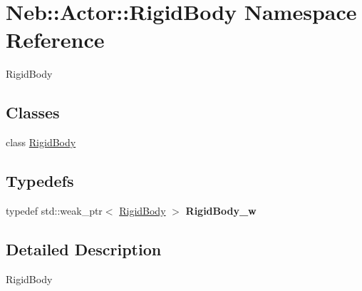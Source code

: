 \hypertarget{namespaceNeb_1_1Actor_1_1RigidBody}{\section{\-Neb\-:\-:\-Actor\-:\-:\-Rigid\-Body \-Namespace \-Reference}
\label{namespaceNeb_1_1Actor_1_1RigidBody}
}


\-Rigid\-Body  


\subsection*{\-Classes}
\begin{DoxyCompactItemize}
\item 
class \hyperlink{classNeb_1_1Actor_1_1RigidBody_1_1RigidBody}{\-Rigid\-Body}
\end{DoxyCompactItemize}
\subsection*{\-Typedefs}
\begin{DoxyCompactItemize}
\item 
\hypertarget{namespaceNeb_1_1Actor_1_1RigidBody_aebb4604ca789a06449e096e08b7cedd9}{typedef std\-::weak\-\_\-ptr$<$ \hyperlink{classNeb_1_1Actor_1_1RigidBody_1_1RigidBody}{\-Rigid\-Body} $>$ {\bfseries \-Rigid\-Body\-\_\-w}}\label{namespaceNeb_1_1Actor_1_1RigidBody_aebb4604ca789a06449e096e08b7cedd9}

\end{DoxyCompactItemize}


\subsection{\-Detailed \-Description}
\-Rigid\-Body 